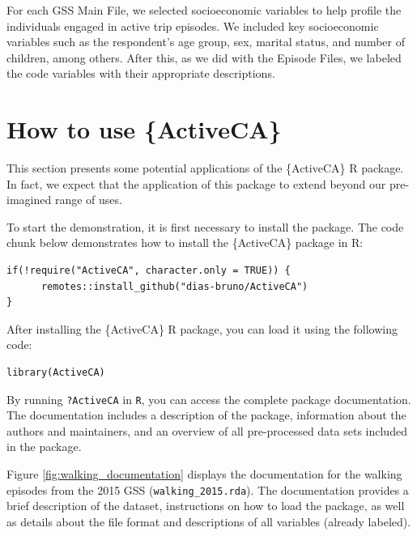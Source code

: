\documentclass[Royal,times,sageh]{sagej}
\begin{document}
For each GSS Main File, we selected socioeconomic variables to help
profile the individuals engaged in active trip episodes. We included key
socioeconomic variables such as the respondent's age group, sex, marital
status, and number of children, among others. After this, as we did with
the Episode Files, we labeled the code variables with their appropriate
descriptions.

\hypertarget{how-to-use-activeca}{%
\section{How to use \{ActiveCA\}}\label{how-to-use-activeca}}

This section presents some potential applications of the \{ActiveCA\} R
package. In fact, we expect that the application of this package to
extend beyond our pre-imagined range of uses.

To start the demonstration, it is first necessary to install the
package. The code chunk below demonstrates how to install the
\{ActiveCA\} package in R:

\begin{verbatim}
if(!require("ActiveCA", character.only = TRUE)) {
      remotes::install_github("dias-bruno/ActiveCA")
}
\end{verbatim}

After installing the \{ActiveCA\} R package, you can load it using the
following code:

\begin{verbatim}
library(ActiveCA)
\end{verbatim}

By running \texttt{?ActiveCA} in \texttt{R}, you can access the complete
package documentation. The documentation includes a description of the
package, information about the authors and maintainers, and an overview
of all pre-processed data sets included in the package.

Figure \ref{fig:walking_documentation} displays the documentation for
the walking episodes from the 2015 GSS (\texttt{walking\_2015.rda}). The
documentation provides a brief description of the dataset, instructions
on how to load the package, as well as details about the file format and
descriptions of all variables (already labeled).
\end{document}
